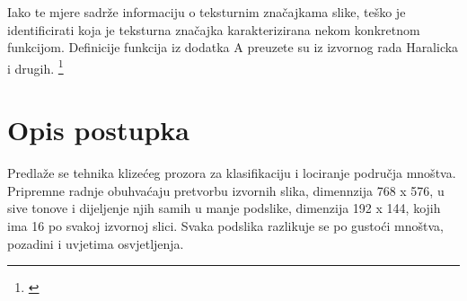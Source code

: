\documentclass[times, utf8, zavrsni]{fer}
\begin{document}
\bigbreak

Iako te mjere sadrže informaciju o teksturnim značajkama slike, teško je identificirati koja je teksturna 
značajka karakterizirana nekom konkretnom funkcijom. Definicije funkcija iz dodatka A
preuzete su iz izvornog rada Haralicka i drugih. \footnote{\cite{haralick}}

\chapter{Opis postupka}

Predlaže se tehnika klizećeg prozora za klasifikaciju i lociranje područja
mnoštva. Pripremne radnje obuhvaćaju pretvorbu izvornih slika, dimennzija
768 x 576, u sive tonove i dijeljenje njih samih u manje podslike, dimenzija
192 x 144, kojih ima 16 po svakoj izvornoj slici. Svaka podslika razlikuje se 
po gustoći mnoštva, pozadini i uvjetima osvjetljenja.  
\end{document}
